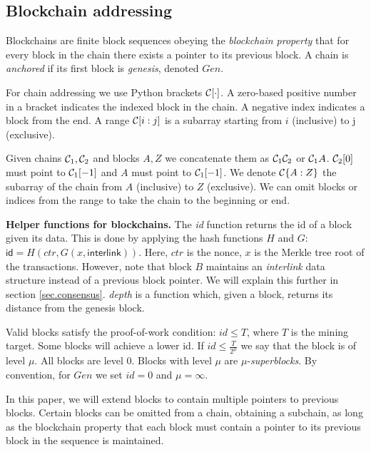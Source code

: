 \subsection{Blockchain addressing}
Blockchains are finite block sequences obeying the \textit{blockchain property}
that for every block in the chain there exists a pointer to its previous block.
A chain is \textit{anchored} if its first block is \textit{genesis}, denoted
$Gen$.

For chain addressing we use Python brackets $\mathcal{C}[\cdot]$. A zero-based
positive number in a bracket indicates the indexed block in the chain. A
negative index indicates a block from the end. A range $\mathcal{C}[i:j]$ is a
subarray starting from $i$ (inclusive) to j (exclusive).

Given chains $\mathcal{C}_1, \mathcal{C}_2$ and blocks $A, Z$ we concatenate them as
$\mathcal{C}_1 \mathcal{C}_2$ or $\mathcal{C}_1 A$. $\mathcal{C}_2[0]$ must point to $\mathcal{C}_1[-1]$
and $A$ must point to $\mathcal{C}_1[-1]$. We denote $\mathcal{C}\{A:Z\}$ the subarray of
the chain from $A$ (inclusive) to $Z$ (exclusive). We can omit blocks or indices
from the range to take the chain to the beginning or end.

\textbf{Helper functions for blockchains.} The \textit{id} function returns the id of a block
given its data. This is done by applying the hash functions $H$ and $G$:
$\textsf{id} = H(ctr, G(x, \textsf{interlink}))$. Here, $ctr$ is the nonce, $x$
is the Merkle tree root of the transactions.%
However, note
that block $B$ maintains an \textit{interlink} data structure instead of a
previous block pointer. We will explain this further in section
\ref{sec.consensus}. \textit{depth} is a function which, given a block, returns
its distance from the genesis block.

Valid blocks satisfy the proof-of-work condition: $id \leq T$, where
$T$ is the mining target. Some blocks will achieve a lower id. If $id \leq
\frac{T}{2^\mu}$ we say that the block is of level $\mu$. All blocks are
level $0$. Blocks with level $\mu$ are $\mu$-\textit{superblocks}.
By convention, for $Gen$ we set $id = 0$ and $\mu = \infty$.

In this paper, we will extend blocks to contain multiple pointers to previous
blocks. Certain blocks can be omitted from a chain, obtaining a subchain, as
long as the blockchain property that each block must contain a pointer to its
previous block in the sequence is maintained.

